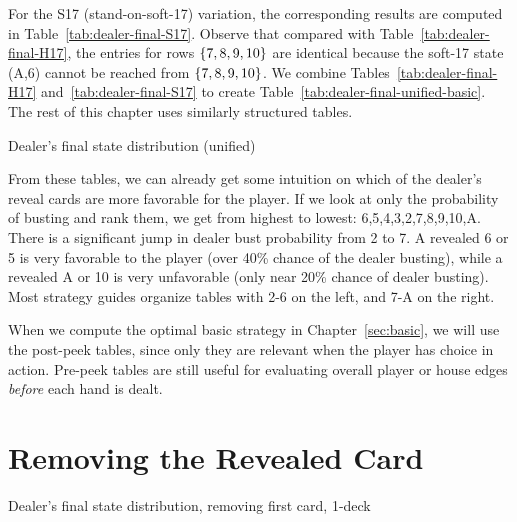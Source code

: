 For the S17 (stand-on-soft-17) variation, the corresponding results are
computed in Table~\ref{tab:dealer-final-S17}.
Observe that compared with Table~\ref{tab:dealer-final-H17},
the entries for rows $\left\{7,8,9,10\right\}$ are identical because the
soft-17 state (A,6) cannot be reached from $\left\{7,8,9,10\right\}$.
We combine Tables~\ref{tab:dealer-final-H17} and~\ref{tab:dealer-final-S17}
to create Table~\ref{tab:dealer-final-unified-basic}.
The rest of this chapter uses similarly structured tables.  

\begin{table}[ht!]
\caption{Dealer's final state distribution (unified)}
\begin{center}

\end{center}
\label{tab:dealer-final-unified-basic}
\end{table}

From these tables, we can already get some intuition on
which of the dealer's reveal cards are more favorable for the player.
If we look at only the probability of busting and rank them, 
we get from highest to lowest: 6,5,4,3,2,7,8,9,10,A.
There is a significant jump in dealer bust probability from 2 to 7.  
A revealed 6 or 5 is very favorable to the player (over 40\% chance of 
the dealer busting), 
while a revealed A or 10 is very unfavorable 
(only near 20\% chance of dealer busting).
Most strategy guides organize tables with 2-6 on the left, 
and 7-A on the right.


When we compute the optimal basic strategy in Chapter~\ref{sec:basic}, 
we will use the post-peek tables, since only they are relevant
when the player has choice in action.  
Pre-peek tables are still useful for evaluating overall player or house
edges \emph{before} each hand is dealt.

\section{Removing the Revealed Card}
\label{sec:dealer:reveal}

\begin{table}[ht!]
\caption{Dealer's final state distribution, removing first card, 1-deck}
\begin{center}

\end{center}
\label{tab:dealer-final-unified-dynamic-1}
\end{table}

